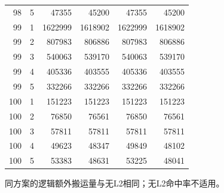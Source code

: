 \begin{longtable}{rrrrrr}
98 & 5 & 47355 & 45200 & 47355 & 45200 \\
99 & 1 & 1622999 & 1618902 & 1622999 & 1618902 \\
99 & 2 & 807983 & 806886 & 807983 & 806886 \\
99 & 3 & 540063 & 539170 & 540063 & 539170 \\
99 & 4 & 405336 & 403555 & 405336 & 403555 \\
99 & 5 & 332266 & 332266 & 332266 & 332266 \\
100 & 1 & 151223 & 151223 & 151223 & 151223 \\
100 & 2 & 76850 & 76561 & 76850 & 76561 \\
100 & 3 & 57811 & 57811 & 57811 & 57811 \\
100 & 4 & 49623 & 48347 & 49849 & 48102 \\
100 & 5 & 53383 & 48631 & 53225 & 48041 \\
\bottomrule
\end{longtable}
同方案的逻辑额外搬运量与无L2相同；无L2命中率不适用。
